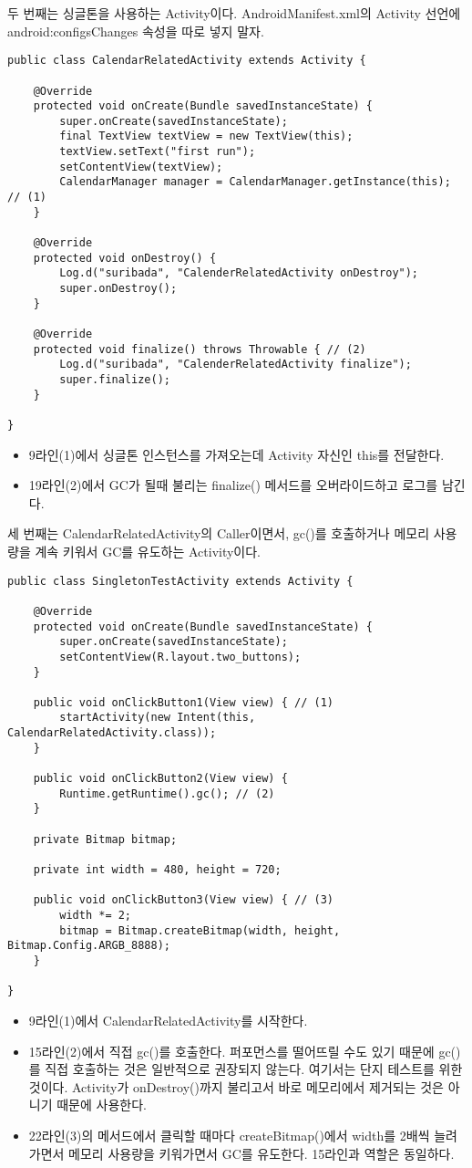 두 번째는 싱글톤을 사용하는 Activity이다. AndroidManifest.xml의 Activity 선언에 android:configsChanges 속성을 따로 넣지 말자.
\begin{lstlisting}[frame=single]
public class CalendarRelatedActivity extends Activity {

	@Override
	protected void onCreate(Bundle savedInstanceState) {
		super.onCreate(savedInstanceState);
		final TextView textView = new TextView(this);
		textView.setText("first run");
		setContentView(textView);
		CalendarManager manager = CalendarManager.getInstance(this); // (1)
	}

	@Override
	protected void onDestroy() {
		Log.d("suribada", "CalenderRelatedActivity onDestroy");
		super.onDestroy();
	}
	
	@Override
	protected void finalize() throws Throwable { // (2)
		Log.d("suribada", "CalenderRelatedActivity finalize");
		super.finalize();
	}
	
}
\end{lstlisting}
\begin{itemize}
\item 9라인(1)에서 싱글톤 인스턴스를 가져오는데 Activity 자신인 this를 전달한다.
\item 19라인(2)에서 GC가 될때 불리는 finalize() 메서드를 오버라이드하고 로그를 남긴다.
\end{itemize}

세 번째는 CalendarRelatedActivity의 Caller이면서, gc()를 호출하거나 메모리 사용량을 계속 키워서 GC를 유도하는 Activity이다.
\begin{lstlisting}[frame=single]
public class SingletonTestActivity extends Activity {

    @Override
    protected void onCreate(Bundle savedInstanceState) {
        super.onCreate(savedInstanceState);
        setContentView(R.layout.two_buttons);
    }

    public void onClickButton1(View view) { // (1)
        startActivity(new Intent(this, CalendarRelatedActivity.class));
    }
    
	public void onClickButton2(View view) {
		Runtime.getRuntime().gc(); // (2)
	}
	
    private Bitmap bitmap;

    private int width = 480, height = 720;

    public void onClickButton3(View view) { // (3)
        width *= 2;
        bitmap = Bitmap.createBitmap(width, height, Bitmap.Config.ARGB_8888);
    }

}
\end{lstlisting}
\begin{itemize}
\item 9라인(1)에서 CalendarRelatedActivity를 시작한다.
\item 15라인(2)에서 직접 gc()를 호출한다. 퍼포먼스를 떨어뜨릴 수도 있기 때문에 gc()를 직접 호출하는 것은 일반적으로 권장되지 않는다. 여기서는 단지 테스트를 위한 것이다. Activity가 onDestroy()까지 불리고서 바로 메모리에서 제거되는 것은 아니기 때문에 사용한다.
\item 22라인(3)의 메서드에서 클릭할 때마다 createBitmap()에서 width를 2배씩 늘려가면서 메모리 사용량을 키워가면서 GC를 유도한다. 15라인과 역할은 동일하다.
\end{itemize}

